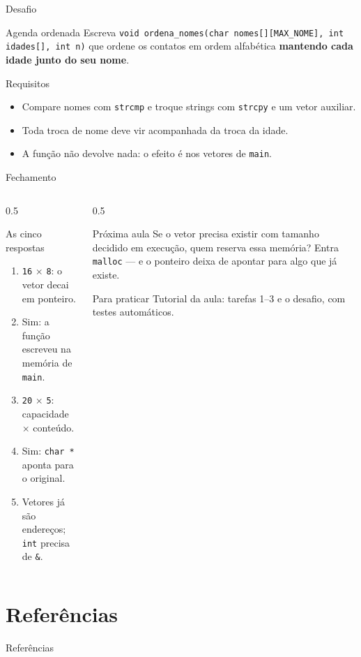 \documentclass[aspectratio=169]{beamer}
\begin{document}
\begin{frame}{Desafio}
  \begin{alertblock}{Agenda ordenada}
    Escreva \texttt{void ordena\_nomes(char nomes[][MAX\_NOME], int idades[], int n)}
    que ordene os contatos em ordem alfabética \textbf{mantendo cada idade junto
    do seu nome}.
  \end{alertblock}
  \begin{block}{Requisitos}
    \begin{itemize}
      \item Compare nomes com \texttt{strcmp} e troque strings com
            \texttt{strcpy} e um vetor auxiliar.
      \item Toda troca de nome deve vir acompanhada da troca da idade.
      \item A função não devolve nada: o efeito é nos vetores de \texttt{main}.
    \end{itemize}
  \end{block}
\end{frame}

\begin{frame}{Fechamento}
  \begin{columns}[T]
    \begin{column}{0.5\textwidth}
      \begin{block}{As cinco respostas}
        \begin{enumerate}\small
          \item \texttt{16} $\times$ \texttt{8}: o vetor decai em ponteiro.
          \item Sim: a função escreveu na memória de \texttt{main}.
          \item \texttt{20} $\times$ \texttt{5}: capacidade $\times$ conteúdo.
          \item Sim: \texttt{char *} aponta para o original.
          \item Vetores já são endereços; \texttt{int} precisa de \texttt{\&}.
        \end{enumerate}
      \end{block}
    \end{column}
    \begin{column}{0.5\textwidth}
      \begin{block}{Próxima aula}
        Se o vetor precisa existir com tamanho decidido em execução, quem
        reserva essa memória? Entra \texttt{malloc} --- e o ponteiro deixa de
        apontar para algo que já existe.
      \end{block}
      \begin{exampleblock}{Para praticar}
        Tutorial da aula: tarefas 1--3 e o desafio, com testes automáticos.
      \end{exampleblock}
    \end{column}
  \end{columns}
\end{frame}

\section*{Referências}
\begin{frame}[allowframebreaks]{Referências}
  \scriptsize
  \nocite{*}
  
  
\end{frame}
\end{document}
